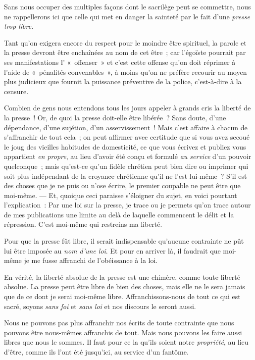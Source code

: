 \documentclass[french,twoside]{book} %
\begin{document}
\noindent Sans nous occuper des multiples façons dont le sacrilège peut se commettre, nous ne rappellerons ici que celle qui met en danger la sainteté par le fait d’une \emph{presse trop libre.}\par
Tant qu’on exigera encore du respect pour le moindre être spirituel, la parole et la presse devront être enchaînées au nom de cet être ; car l’égoïste pourrait par ses manifestations l’ « offenser » et c’est cette offense qu’on doit réprimer à l’aide de « pénalités convenables », à moins qu’on ne préfère recourir au moyen plus judicieux que fournit la puissance préventive de la police, c’est-à-dire à la censure.\par
Combien de gens nous entendons tous les jours appeler à grands cris la liberté de la presse ! Or, de  quoi la presse doit-elle être libérée ? Sans doute, d’une dépendance, d’une sujétion, d’un asservissement ! Mais c’est affaire à chacun de s’affranchir de tout cela ; on peut affirmer avec certitude que si vous avez secoué le joug des vieilles habitudes de domesticité, ce que vous écrivez et publiez vous appartient \emph{en propre}, au lieu d’avoir été conçu et formulé \emph{au service} d’un pouvoir quelconque ; mais qu’est-ce qu’un fidèle chrétien peut bien dire ou imprimer qui soit plus indépendant de la croyance chrétienne qu’il ne l’est lui-même ? S’il est des choses que je ne puis ou n’ose écrire, le premier coupable ne peut être que moi-même. — Et, quoique ceci paraisse s’éloigner du sujet, en voici pourtant l’explication : Par une loi sur la presse, je trace ou je permets qu’on trace autour de mes publications une limite au delà de laquelle commencent le délit et la répression. C’est moi-même qui restreins ma liberté.\par
Pour que la presse fût libre, il serait indispensable qu’aucune contrainte ne pût lui être imposée au \emph{nom d’une loi}. Et pour en arriver là, il faudrait que moi-même je me fusse affranchi de l’obéissance à la loi.\par
En vérité, la liberté absolue de la presse est une chimère, comme toute liberté absolue. La presse peut être libre de bien des choses, mais elle ne le sera jamais que de ce dont je serai moi-même libre. Affranchissons-nous de tout ce qui est sacré, soyons \emph{sans foi} et \emph{sans loi} et nos discours le seront aussi.\par
Nous ne pouvons pas plus affranchir nos écrits de toute contrainte que nous pouvons être nous-mêmes affranchis de tout. Mais nous pouvons les faire aussi libres que nous le sommes. Il faut pour ce la qu’ils soient notre \emph{propriété}, au lieu d’être, comme ils l’ont été jusqu’ici, au service d’un fantôme.\par
\end{document}
